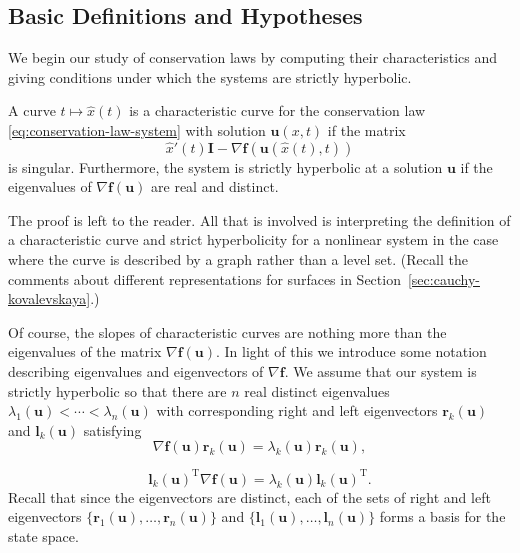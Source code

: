 \subsection{Basic Definitions and Hypotheses}\label{sec:conservation-basic-definitions}

We begin our study of conservation laws by computing their characteristics and giving conditions under which the systems are strictly hyperbolic.

\begin{Lemma}
\label{lem:conservation-characteristics}
A curve $t\mapsto\hat x(t)$ is a characteristic curve for the conservation law \eqref{eq:conservation-law-system} with solution $\bm{u}(x,t)$ if the matrix
\begin{equation}\label{eq:conservation-characteristic-matrix}
\hat x'(t)\bm{I}-\nabla\bm{f}(\bm{u}(\hat x(t),t))
\end{equation}
is singular. Furthermore, the system is strictly hyperbolic at a solution $\bm{u}$ if the eigenvalues of $\nabla\bm{f}(\bm{u})$ are real and distinct.
\end{Lemma}

The proof is left to the reader. All that is involved is interpreting the definition of a characteristic curve and strict hyperbolicity for a nonlinear system in the case where the curve is described by a graph rather than a level set. (Recall the comments about different representations for surfaces in Section~\ref{sec:cauchy-kovalevskaya}.)

Of course, the slopes of characteristic curves are nothing more than the eigenvalues of the matrix $\nabla\bm{f}(\bm{u})$. In light of this we introduce some notation describing eigenvalues and eigenvectors of $\nabla\bm{f}$. We assume that our system is strictly hyperbolic so that there are $n$ real distinct eigenvalues $\lambda_1(\bm{u})<\cdots<\lambda_n(\bm{u})$ with corresponding right and left eigenvectors $\bm{r}_k(\bm{u})$ and $\bm{l}_k(\bm{u})$ satisfying
\begin{equation}\label{eq:conservation-right-eigenvectors}
\nabla\bm{f}(\bm{u})\bm{r}_k(\bm{u})=\lambda_k(\bm{u})\bm{r}_k(\bm{u}),
\end{equation}

\begin{equation}\label{eq:conservation-left-eigenvectors}
\bm{l}_k(\bm{u})^\mathrm{T}\nabla\bm{f}(\bm{u})=\lambda_k(\bm{u})\bm{l}_k(\bm{u})^\mathrm{T}.
\end{equation}
Recall that since the eigenvectors are distinct, each of the sets of right and left eigenvectors $\{\bm{r}_1(\bm{u}),\allowbreak \ldots,\bm{r}_n(\bm{u})\}$ and $\{\bm{l}_1(\bm{u}),\allowbreak \ldots,\bm{l}_n(\bm{u})\}$ forms a basis for the state space.

